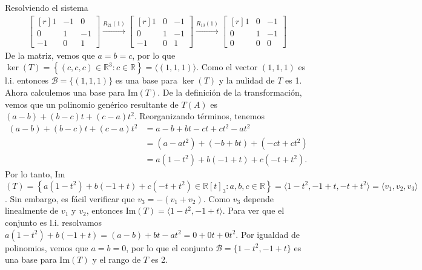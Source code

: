 \documentclass[11pt]{article}
\begin{document}
\begin{enumerate}
	Resolviendo el sistema
	\begin{gather*}
		\begin{bmatrix*}[r]
	    	1 & -1 & 0 \\ 
		    0 & 1 & -1 \\
		    -1 & 0 & 1
		\end{bmatrix*} \xrightarrow{R_{21}(1)}
		\begin{bmatrix*}[r]
		    1 & 0 & -1 \\ 
		    0 & 1 & -1 \\
		    -1 & 0 & 1
		\end{bmatrix*} \xrightarrow{R_{13}(1)}
		\begin{bmatrix*}[r]
		    1 & 0 & -1 \\ 
		    0 & 1 & -1 \\
		    0 & 0 & 0
		\end{bmatrix*}
	\end{gather*}
	De la matriz, vemos que $a=b=c$, por lo que $\ker (T) = \left\{(c,c,c)\in \mathbb{R}^3:c\in \mathbb{R}\right\}=\langle (1,1,1) \rangle$. Como el vector $(1,1,1)$ es l.i. entonces $\mathcal{B}=\{(1,1,1)\}$ es una base para $\ker (T)$ y la nulidad de $T$ es 1. \\
	Ahora calculemos una base para Im$(T)$. De la definición de la transformación, vemos que un polinomio genérico resultante de $T(A)$ es $(a-b) + (b-c)t + (c-a)t^2$. Reorganizando términos, tenemos
	\begin{align*}
		(a-b) + (b-c)t + (c-a)t^2 &= a-b+bt-ct+ct^2-at^2 \\
								  &= (a-at^2) + (-b+bt) + (-ct+ct^2) \\
								  &= a(1-t^2) + b(-1+t) + c(-t+t^2).
	\end{align*}
	Por lo tanto, Im$(T)=\left\{ a(1-t^2) + b(-1+t) + c(-t+t^2) \in \mathbb{R}[t]_3 : a,b,c\in \mathbb{R} \right\}=\langle 1-t^2,-1+t,-t+t^2 \rangle = \langle v_1,v_2,v_3 \rangle$. Sin embargo, es fácil verificar que $v_3=-(v_1+v_2)$. Como $v_3$ depende linealmente de $v_1$ y $v_2$, entonces Im$(T)= \langle 1-t^2,-1+t \rangle$. Para ver que el conjunto es l.i. resolvamos $a(1-t^2)+b(-1+t)=(a-b)+bt-at^2=0+0t+0t^2$. Por igualdad de polinomios, vemos que $a=b=0$, por lo que el conjunto $\mathcal{B}=\{ 1-t^2,-1+t \}$ es una base para Im$(T)$ y el rango de $T$ es 2.
	
\end{enumerate}
\end{document}
